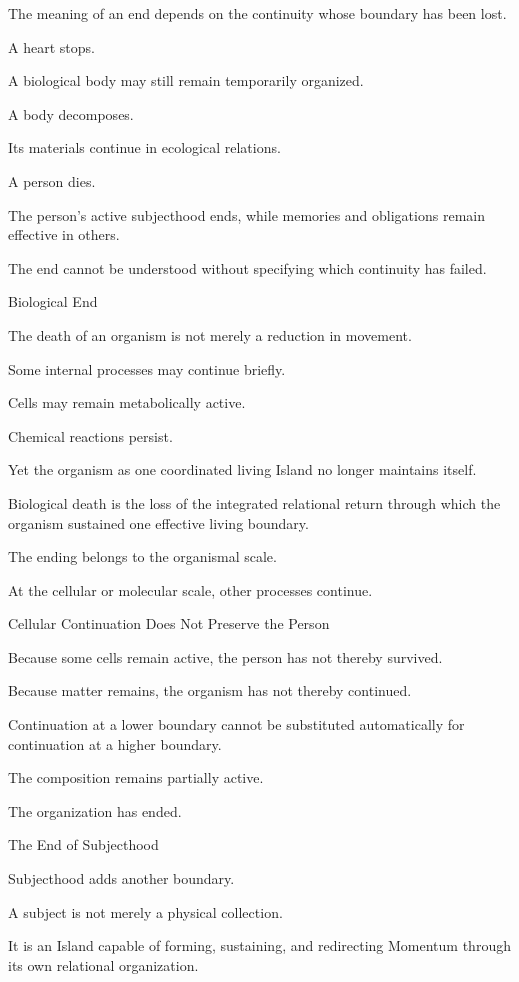 The meaning of an end depends on the continuity whose boundary has been lost.

A heart stops.

A biological body may still remain temporarily organized.

A body decomposes.

Its materials continue in ecological relations.

A person dies.

The person’s active subjecthood ends, while memories and obligations remain effective in others.

The end cannot be understood without specifying which continuity has failed.

Biological End

The death of an organism is not merely a reduction in movement.

Some internal processes may continue briefly.

Cells may remain metabolically active.

Chemical reactions persist.

Yet the organism as one coordinated living Island no longer maintains itself.

Biological death is the loss of the integrated relational return through which the organism sustained one effective living boundary.

The ending belongs to the organismal scale.

At the cellular or molecular scale, other processes continue.

Cellular Continuation Does Not Preserve the Person

Because some cells remain active, the person has not thereby survived.

Because matter remains, the organism has not thereby continued.

Continuation at a lower boundary cannot be substituted automatically for continuation at a higher boundary.

The composition remains partially active.

The organization has ended.

The End of Subjecthood

Subjecthood adds another boundary.

A subject is not merely a physical collection.

It is an Island capable of forming, sustaining, and redirecting Momentum through its own relational organization.

